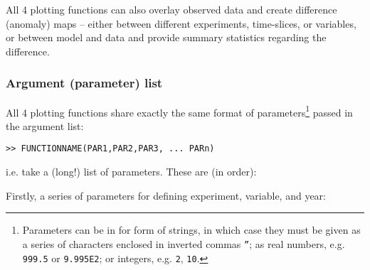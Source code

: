 \documentclass[11pt,fleqn]{book} %
\begin{document}
All 4 plotting functions can also overlay observed data and create difference (anomaly) maps -- either between different experiments, time-slices, or variables, or between model and data and provide summary statistics regarding the difference.

\subsubsection{Argument (parameter) list}

All 4 plotting functions share exactly the same format of parameters\footnote{Parameters can be in for form of strings, in which case they must be given as a series of characters enclosed in inverted commas \texttt{''}; as real numbers, e.g. \texttt{999.5} or \texttt{9.995E2}; or integers, e.g. \texttt{2}, \texttt{10}.} passed in the argument list:

\vspace{-2mm}
\small\begin{verbatim}
>> FUNCTIONNAME(PAR1,PAR2,PAR3, ... PARn)
\end{verbatim}\normalsize
\vspace{-2mm}
\noindent i.e. take a (long!) list of parameters. These are (in order):

\vspace{1mm}
\noindent Firstly, a series of parameters for defining experiment, variable, and year:
\end{document}

